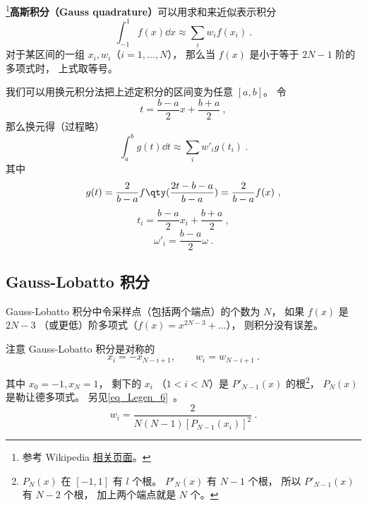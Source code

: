 
\begin{issues}
\issueAbstract
\end{issues}


\footnote{参考 Wikipedia \href{https://en.wikipedia.org/wiki/Gaussian_quadrature}{相关页面}。}\textbf{高斯积分（Gauss quadrature）}可以用求和来近似表示积分
\begin{equation}
\int_{-1}^1 f(x) \dd{x} \approx \sum_i w_i f(x_i)~.
\end{equation}
对于某区间的一组 $x_i, w_i$（$i = 1,\dots,N$）， 那么当 $f(x)$ 是小于等于 $2N-1$ 阶的多项式时， 上式取等号。

我们可以用换元积分法把上述定积分的区间变为任意 $[a,b]$。 令
\begin{equation}
t = \frac{b-a}{2}x + \frac{b+a}{2}~,
\end{equation}
那么换元得（过程略）
\begin{equation}
\int_a^b g(t) \dd{t} \approx \sum_i w'_i g(t_i)~.
\end{equation}
其中
\begin{equation}
g(t) = \frac{2}{b-a} f\qty(\frac{2t - b - a}{b - a}) = \frac{2}{b-a} f(x)~,
\end{equation}
\begin{equation}
t_i = \frac{b-a}{2}x_i + \frac{b+a}{2}~,
\end{equation}
\begin{equation}
\omega'_i = \frac{b-a}{2}\omega~.
\end{equation}


\subsection{Gauss-Lobatto 积分}
Gauss-Lobatto 积分中令采样点（包括两个端点）的个数为 $N$， 如果 $f(x)$ 是 $2N-3$ （或更低）阶多项式（$f(x) = x^{2N-3} + \dots$）， 则积分没有误差。

注意 Gauss-Lobatto 积分是对称的
\begin{equation}\label{eq_GLquad_5}
x_i = -x_{N-i+1}, \qquad w_{i} = w_{N-i+1}~.
\end{equation}

其中 $x_0 = -1, x_N = 1$， 剩下的 $x_i$ （$1 < i < N$）是 $P'_{N-1}(x)$ 的根\footnote{$P_N(x)$ 在 $[-1,1]$ 有 $l$ 个根。 $P'_N(x)$ 有 $N-1$ 个根， 所以 $P'_{N-1}(x)$ 有 $N-2$ 个根， 加上两个端点就是 $N$ 个。}， $P_N(x)$ 是勒让德多项式。 另见\autoref{eq_Legen_6}~。
\begin{equation} %
w_i = \frac{2}{N(N-1)[P_{N-1}(x_i)]^2}~.
\end{equation}

